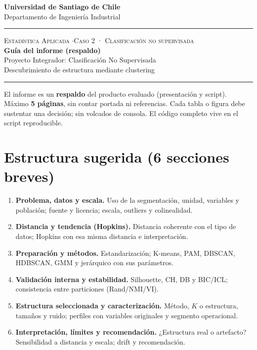 \documentclass[11pt,letterpaper]{article}
\newcommand{\hrulethin}{\noindent\rule{\textwidth}{0.6pt}}
\begin{document}
\pagestyle{plain}
\begin{center}
    \textbf{\large Universidad de Santiago de Chile}\\[0.1cm]
    Departamento de Ingeniería Industrial
\end{center}
\vspace{0.15cm}\hrulethin\vspace{0.35cm}
\begin{center}
    {\scshape Estadística Aplicada \quad$\cdot$\quad Caso 2 · Clasificación no supervisada}\\[0.35cm]
    {\LARGE \textbf{Guía del informe (respaldo)}}\\[0.15cm]
    {\large Proyecto Integrador: Clasificación No Supervisada}\\[0.2cm]
    Descubrimiento de estructura mediante clustering
\end{center}
\vspace{0.2cm}\hrulethin\vspace{0.4cm}
El informe es un \textbf{respaldo} del producto evaluado (presentación y script). Máximo \textbf{5 páginas}, sin contar portada ni referencias. Cada tabla o figura debe sustentar una decisión; sin volcados de consola. El código completo vive en el script reproducible.

\section*{Estructura sugerida (6 secciones breves)}
\begin{enumerate}
\item \textbf{Problema, datos y escala.} Uso de la segmentación, unidad, variables y población; fuente y licencia; escala, outliers y colinealidad.
\item \textbf{Distancia y tendencia (Hopkins).} Distancia coherente con el tipo de datos; Hopkins con esa misma distancia e interpretación.
\item \textbf{Preparación y métodos.} Estandarización; K-means, PAM, DBSCAN, HDBSCAN, GMM y jerárquico con sus parámetros.
\item \textbf{Validación interna y estabilidad.} Silhouette, CH, DB y BIC/ICL; consistencia entre particiones (Rand/NMI/VI).
\item \textbf{Estructura seleccionada y caracterización.} Método, $K$ o estructura, tamaños y ruido; perfiles con variables originales y segmento operacional.
\item \textbf{Interpretación, límites y recomendación.} ¿Estructura real o artefacto? Sensibilidad a distancia y escala; drift y recomendación.
\end{enumerate}
\end{document}
